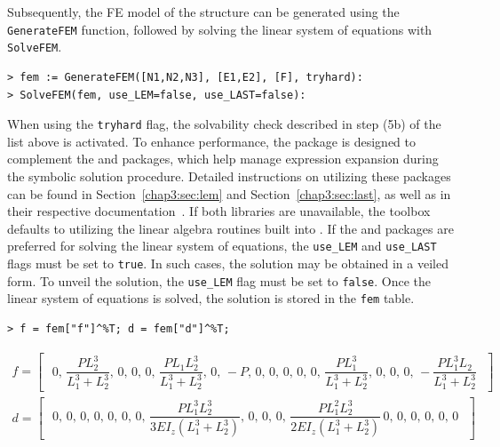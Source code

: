 Subsequently, the \ac{FE} model of the structure can be generated using the \texttt{GenerateFEM} function, followed by solving the linear system of equations with \texttt{SolveFEM}.
%
\begin{verbatim}
> fem := GenerateFEM([N1,N2,N3], [E1,E2], [F], tryhard):
> SolveFEM(fem, use_LEM=false, use_LAST=false):
\end{verbatim}
%
When using the \texttt{tryhard} flag, the solvability check described in step (5b) of the list above is activated. To enhance performance, the \TrussMe{} package is designed to complement the \LEM{} and \LAST{} packages, which help manage expression expansion during the symbolic solution procedure. Detailed instructions on utilizing these packages can be found in Section~\ref{chap3:sec:lem} and Section~\ref{chap3:sec:last}, as well as in their respective documentation~\cite{lem, last}. If both libraries are unavailable, the toolbox defaults to utilizing the linear algebra routines built into \Maple{}. If the \LEM{} and \LAST{} packages are preferred for solving the linear system of equations, the \texttt{use\_LEM} and \texttt{use\_LAST} flags must be set to \texttt{true}. In such cases, the solution may be obtained in a veiled form. To unveil the solution, the \texttt{use\_LEM} flag must be set to \texttt{false}. Once the linear system of equations is solved, the solution is stored in the \texttt{fem} table.
%
\begin{verbatim}
> f = fem["f"]^%T; d = fem["d"]^%T;
\end{verbatim}
\begin{small}
  \begin{equation*}
    \begin{matrix}
      f = \left[\,\begin{matrix}
        \, 0, \, \dfrac{PL_2^3}{L_1^3+L_2^3}, \, 0, \, 0, \, 0, \, \dfrac{PL_1L_2^3}{L_1^3+L_2^3}, \, 0, \, -P, \, 0, \, 0, \, 0, \, 0, \, 0, \, \dfrac{PL_1^3}{L_1^3+L_2^3}, \, 0, \, 0, \, 0, \, -\dfrac{PL_1^3L_2}{L_1^3+L_2^3} \,
      \end{matrix}\,\right] \\[1.5em]
      d = \left[\,\begin{matrix}
        \, 0, \, 0, \, 0, \, 0, \, 0, \, 0, \, 0, \, \dfrac{PL_1^3L_2^3}{3EI_z(L_1^3+L_2^3)}, \, 0, \, 0, \, 0, \, \dfrac{PL_1^2L_2^3}{2EI_z(L_1^3+L_2^3)} \, 0, \, 0, \, 0, \, 0, \, 0, \, 0 \,
      \end{matrix}\,\right]
    \end{matrix}
  \end{equation*}
\end{small}

